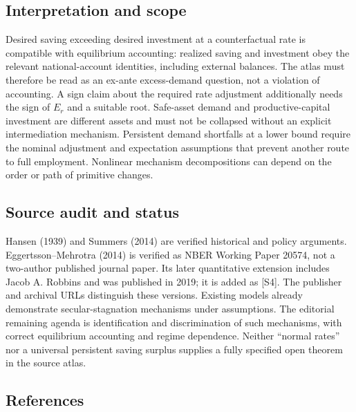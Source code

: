 \documentclass[11pt,a4paper]{article}
\begin{document}
\subsection*{Interpretation and scope}

Desired saving exceeding desired investment at a counterfactual rate is compatible with equilibrium accounting: realized saving and investment obey the relevant national-account identities, including external balances. The atlas must therefore be read as an ex-ante excess-demand question, not a violation of accounting. A sign claim about the required rate adjustment additionally needs the sign of $E_r$ and a suitable root. Safe-asset demand and productive-capital investment are different assets and must not be collapsed without an explicit intermediation mechanism. Persistent demand shortfalls at a lower bound require the nominal adjustment and expectation assumptions that prevent another route to full employment. Nonlinear mechanism decompositions can depend on the order or path of primitive changes.

\subsection*{Source audit and status}

Hansen (1939) and Summers (2014) are verified historical and policy arguments. Eggertsson--Mehrotra (2014) is verified as NBER Working Paper 20574, not a two-author published journal paper. Its later quantitative extension includes Jacob A. Robbins and was published in 2019; it is added as [S4]. The publisher and archival URLs distinguish these versions. Existing models already demonstrate secular-stagnation mechanisms under assumptions. The editorial remaining agenda is identification and discrimination of such mechanisms, with correct equilibrium accounting and regime dependence. Neither ``normal rates'' nor a universal persistent saving surplus supplies a fully specified open theorem in the source atlas.

\subsection*{References}
\end{document}

